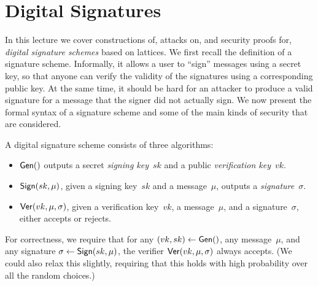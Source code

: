 \documentclass[11pt]{article}
\begin{document}
\thispagestyle{fancy}           %


\section{Digital Signatures}
\label{sec:signatures}

In this lecture we cover constructions of, attacks on, and security
proofs for, \emph{digital signature schemes} based on lattices. We
first recall the definition of a signature scheme. Informally, it
allows a user to ``sign'' messages using a secret key, so that anyone
can verify the validity of the signatures using a corresponding public
key. At the same time, it should be hard for an attacker to produce a
valid signature for a message that the signer did not actually sign.
We now present the formal syntax of a signature scheme and some of the
main kinds of security that are considered.

\begin{definition}
  \label{def:signature}
  A digital signature scheme consists of three algorithms:
  \begin{itemize}[itemsep=0pt]
  \item $\mathsf{Gen}()$ outputs a secret \emph{signing key}~$sk$ and a
    public \emph{verification key}~$vk$.
  \item $\mathsf{Sign}(sk, \mu)$, given a signing key~$sk$ and a
    message~$\mu$, outputs a \emph{signature}~$\sigma$.
  \item $\mathsf{Ver}(vk, \mu, \sigma)$, given a verification key~$vk$, a
    message~$\mu$, and a signature~$\sigma$, either accepts or
    rejects.
  \end{itemize}
  For correctness, we require that for any $(vk, sk) \gets \mathsf{Gen}()$,
  any message~$\mu$, and any signature
  $\sigma \gets \mathsf{Sign}(sk,\mu)$, the verifier
  $\mathsf{Ver}(vk, \mu, \sigma)$ always accepts. (We could also relax this
  slightly, requiring that this holds with high probability over all
  the random choices.)
\end{definition}
\end{document}
